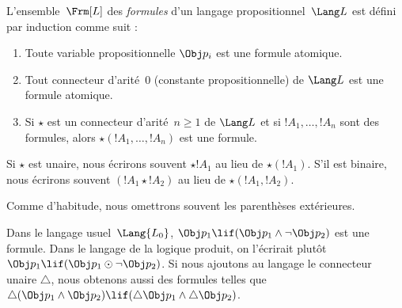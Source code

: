 \documentclass[../../../include/open-logic-section]{subfiles}
\begin{document}


\begin{defn}[Formule]
L'ensemble~$\Frm[L]$ des
\emph{formules} d'un langage
propositionnel~$\Lang L$ est défini
par induction comme suit :
\begin{enumerate}
\item Toute variable propositionnelle
  $\Obj p_i$ est une formule atomique.
\item Tout connecteur d'arité~$0$
  (constante propositionnelle) de
  $\Lang L$ est une formule atomique.
\item Si $\star$ est un connecteur d'arité~$n\geq1$ de $\Lang L$
  et si $!A_1,\dots,!A_n$ sont des formules, alors
  $\star(!A_1,\dots,!A_n)$ est une formule.
\end{enumerate}
Si $\star$ est unaire, nous écrirons
souvent $\star !A_1$ au lieu de
$\star(!A_1)$. S'il est binaire,
nous écrirons souvent
$(!A_1\star !A_2)$ au lieu de
$\star(!A_1,!A_2)$.
\end{defn}

Comme d'habitude, nous omettrons
souvent les parenthèses extérieures.

\begin{ex}
Dans le langage usuel~$\Lang{L_0}$,
$\Obj p_1\lif(\Obj p_1\land
\lnot\Obj p_2)$ est une formule.
Dans le langage de la logique produit,
on l'écrirait plutôt
$\Obj p_1\lif(\Obj p_1\odot
\lnot\Obj p_2)$. Si nous ajoutons
au langage le connecteur unaire
$\triangle$, nous obtenons aussi
des formules telles que
$\triangle(\Obj p_1\land\Obj p_2)
\lif(\triangle\Obj p_1\land
\triangle\Obj p_2)$.
\end{ex}
\end{document}
